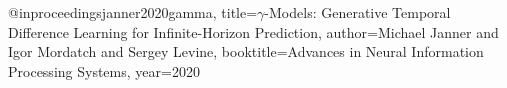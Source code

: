 @inproceedings{janner2020gamma,
  title={$\gamma$-Models: Generative Temporal Difference Learning for Infinite-Horizon Prediction},
  author={Michael Janner and Igor Mordatch and Sergey Levine},
  booktitle={Advances in Neural Information Processing Systems},
  year={2020}
}